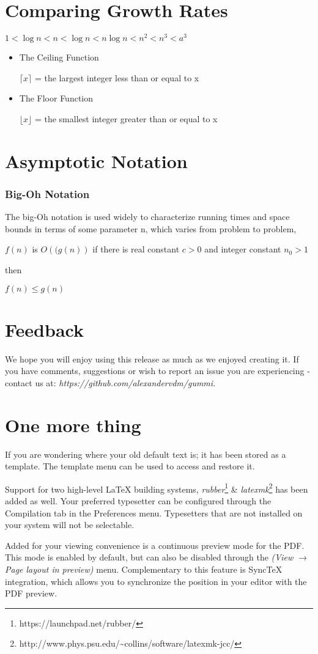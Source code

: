 \documentclass[11pt]{article}
\begin{document}
\section{Comparing Growth Rates}
	\begin{sloppypar}
	$1 < \log n  < n < \log n  < n\log n < n^2 < n^3 < a^3$
	\begin{itemize}
	\item {The Ceiling Function}
	
	$\lceil x \rceil$ = the largest integer less than or equal to x
	\item {The Floor Function}
	
	$\lfloor x \rfloor$ = the smallest integer greater than or equal to x
	
	\end{itemize}
	\end{sloppypar}
	
\section{Asymptotic Notation}
	\subsubsection{Big-Oh Notation}
	The big-Oh notation is used widely to characterize running times and space bounds in terms of some parameter n, which varies from problem to problem,
	
	$f\left(n \right)$ is $O\left((g\left(n \right) \right)$ if there is real constant $c > 0$  and integer constant $n_0 > 1$ 
	
	then
	
	$f\left(n \right) \leq  g\left(n \right)$

\section{Feedback}
We hope you will enjoy using this release as much as we enjoyed creating it. If you have comments, suggestions or wish to report an issue you are experiencing - contact us at: \emph{https://github.com/alexandervdm/gummi}.

\section{One more thing}
If you are wondering where your old default text is; it has been stored as a template. The template menu can be used to access and restore it. 

Support for two high-level {\LaTeX} building systems, \emph{rubber}\footnote{https://launchpad.net/rubber/} \& \emph{latexmk}\footnote{http://www.phys.psu.edu/{\textasciitilde}collins/software/latexmk-jcc/} has been added as well. Your preferred typesetter can be configured through the Compilation tab in the Preferences menu. Typesetters that are not installed on your system will not be selectable. 

Added for your viewing convenience is a continuous preview mode for the PDF. This mode is enabled by default, but can also be disabled through the \emph{(View $\rightarrow$ Page layout in preview)} menu. Complementary to this feature is SyncTeX integration, which allows you to synchronize the position in your editor with the PDF preview. 
\end{document}
